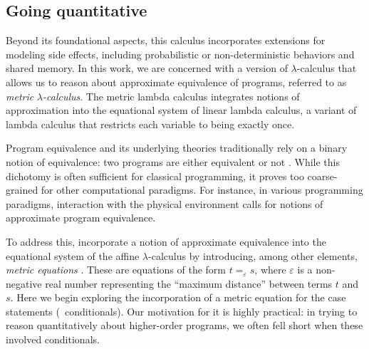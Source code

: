 



\subsection*{Going quantitative}

Beyond its foundational aspects, this calculus incorporates extensions for modeling side effects, including probabilistic or non-deterministic behaviors and shared memory. In this work, we are concerned with a version of $\lambda$-calculus that allows us to reason about approximate equivalence of programs, referred to as \emph{metric }$\lambda$\emph{-calculus}. The metric lambda calculus integrates notions of
approximation into the equational system of linear lambda calculus, a variant of lambda calculus that restricts each variable to being exactly once.

Program equivalence and its underlying theories traditionally rely on a binary notion of equivalence: two programs are either equivalent or not \cite{winskel93}. While this dichotomy is often sufficient for classical programming, it proves too coarse-grained for other computational paradigms. For instance, in various programming paradigms, interaction with the physical environment calls for notions of approximate program equivalence. 


To address this, \cite{dahlqvistInternalLanguage2022,dahlqvist2023syntactic} incorporate a notion of approximate equivalence into the equational system of the affine $\lambda$-calculus by introducing, among other elements, \emph{metric equations} \cite{mardare2016quantitative, mardare2017axiomatizability}. These are equations of the form $t =_{\varepsilon} s$, where $\varepsilon$ is a non-negative real number representing the ``maximum distance'' between terms $t$ and $s$. Here we begin exploring the incorporation of a metric equation for the case statements (\ie\ conditionals). Our motivation for it is highly practical: in trying to reason quantitatively about higher-order programs, we often fell short when these involved conditionals.

